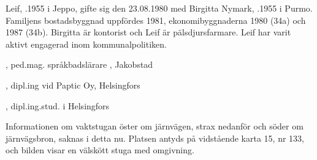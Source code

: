 Leif, .1955 i Jeppo, gifte sig den 23.08.1980 med Birgitta Nymark, .1955 i Purmo. Familjens bostadsbyggnad uppfördes 1981, ekonomibyggnaderna 1980 (34a) och 1987 (34b). Birgitta är kontorist och Leif är pälsdjursfarmare. Leif har varit aktivt engagerad inom kommunalpolitiken.
\begin{jhchildren}
  \item {}, ped.mag. språkbadslärare , Jakobstad
  \item {}, dipl.ing vid Paptic Oy, Helsingfors
  \item {}, dipl.ing.stud. i Helsingfors
\end{jhchildren}





Informationen om vaktstugan öster om järnvägen, strax nedanför och söder om järnvägsbron, saknas i detta nu. Platsen antyds på vidstående karta 15, nr 133, och bilden visar en välskött stuga med omgivning.\jhvspace{}
